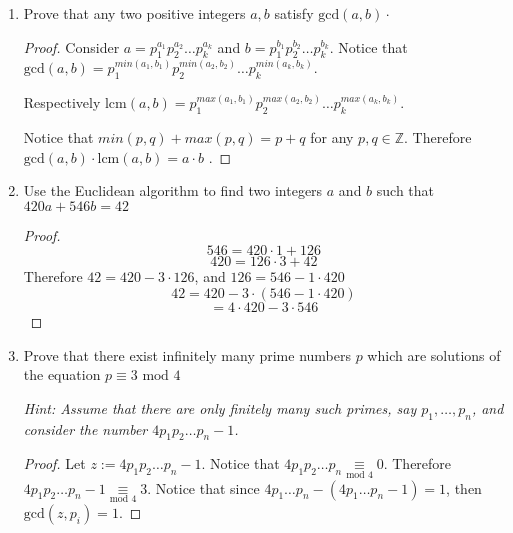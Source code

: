 \documentclass[12pt]{article}
\begin{document}
\begin{enumerate}
            \begin{proof}
                Notice that since $\textrm{gcd}(a,4) = 2$, then $4 \not\vert a$. Since $2 \vert a$, then $a \underset{\textrm{mod }4}{\equiv} 2$. The same argument can be repeated for $b$.
                
                Therefore $a+b \underset{\textrm{mod }4}{\equiv} 0$. Therefore $\textrm{gcd}(a+b,4)=4$.
            \end{proof}
            
            \item Prove that any two positive integers $a,b$ satisfy $\textrm{gcd}(a,b) \cdot $
            \begin{proof}
            Consider $a = p_1^{a_1} p_2^{a_2} \ldots p_k^{a_k}$ and $b= p_1^{b_1} p_2 ^{b_2} \ldots p_k^{b_k}$. Notice that $\textrm{gcd}(a,b) = p_1^{min(a_1,b_1)} p_2^{min(a_2,b_2)}\ldots p_k^{min(a_k,b_k)}$. 
                
                Respectively $\textrm{lcm}(a,b) = p_1^{max(a_1,b_1)} p_2^{max(a_2,b_2)}\ldots p_k^{max(a_k,b_k)}$.
                
                Notice that $min(p,q) + max(p,q) = p+q$ for any  $p,q \in \mathbb Z$. Therefore $\textrm{gcd}(a,b) \cdot \textrm{lcm}(a,b) = a \cdot b$ .
            \end{proof}
            
            \item Use the Euclidean algorithm to find two integers $a$ and $b$ such that $420a + 546 b = 42$
            \begin{proof}
            $$546  = 420 \cdot 1 + 126 $$
            $$420 = 126 \cdot 3 + 42$$
            Therefore 
            $42 = 420 -3 \cdot 126$, and $126 = 546 - 1 \cdot 420$
            $$ 42 = 420 - 3 \cdot ( 546 - 1 \cdot 420)$$
            $$ = 4 \cdot 420 - 3 \cdot 546$$
            
            \end{proof}
            
            \item Prove that there exist infinitely many prime numbers $p$ which are solutions of the equation $ p \equiv 3 \textrm{ mod }4$
            
            \emph{Hint: Assume that there are only finitely many such primes, say $p_1, \ldots, p_n$, and consider the number $4p_1p_2\ldots p_n-1$.}
            
            \begin{proof}
                Let $z := 4p_1p_2\ldots p_n-1$. Notice that $4p_1p_2\ldots p_n \underset{\textrm{mod }4}{\equiv} 0$. Therefore $4p_1p_2\ldots p_n-1 \underset{\textrm{mod }4}{\equiv} 3$. Notice that since $4 p_1 \ldots p_n - (4p_1 \ldots p_n -1) = 1$, then $\textrm{gcd}(z,p_i) = 1$.
                

\end{proof}
\end{enumerate}
\end{document}
